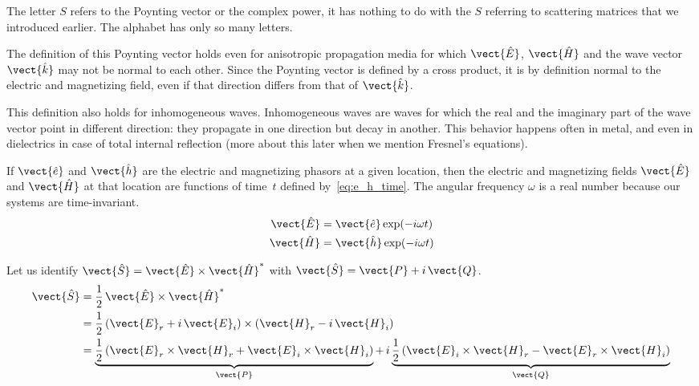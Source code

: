 The letter $S$ refers to the Poynting vector or the complex power, it has nothing to do with the $S$ referring to scattering matrices that we introduced earlier.
The alphabet has only so many letters.

The definition of this Poynting vector holds even for anisotropic propagation media for which $\vect{\hat{E}}$, $\vect{\hat{H}}$ and the wave vector $\vect{\hat{k}}$ may not be normal to each other.
Since the Poynting vector is defined by a cross product, it is by definition normal to the electric and magnetizing field, even if that direction differs from that of $\vect{\hat{k}}$.

This definition also holds for inhomogeneous waves.
Inhomogeneous waves are waves for which the real and the imaginary part of the wave vector point in different direction: they propagate in one direction but decay in another.
This behavior happens often in metal, and even in dielectrics in case of total internal reflection (more about this later when we mention Fresnel's equations).

If $\vect{\hat{e}}$ and $\vect{\hat{h}}$ are the electric and magnetizing phasors at a given location,
then the electric and magnetizing fields $\vect{\hat{E}}$ and $\vect{\hat{H}}$ at that location are functions of time~$t$ defined by~\cref{eq:e_h_time}.
The angular frequency $\omega$ is a real number because our systems are time-invariant.
\begin{subequations}
    \begin{align}
        \vect{\hat{E}} &= \vect{\hat{e}} \exp(-i \omega t) \\
        \vect{\hat{H}} &= \vect{\hat{h}} \exp(-i \omega t)
    \end{align}
    \label{eq:e_h_time}
\end{subequations}

Let us identify $\vect{\hat{S}} = \vect{\hat{E}} \times \vect{\hat{H}}^*$ with $\vect{\hat{S}} = \vect{P} + i\,\vect{Q}$.
\begin{subequations}
    \begin{align}
        \vect{\hat{S}}
        &= \frac{1}{2}\,\vect{\hat{E}} \times \vect{\hat{H}}^* \\
        &= \frac{1}{2}\,(\vect{E}_r + i\,\vect{E}_i) \times (\vect{H}_r - i\,\vect{H}_i) \\
        &= \underbrace{\frac{1}{2}\,(\vect{E}_r \times \vect{H}_r + \vect{E}_i \times \vect{H}_i)}_\vect{P} +\,
         i \underbrace{\frac{1}{2}\,(\vect{E}_i \times \vect{H}_r - \vect{E}_r \times \vect{H}_i)}_\vect{Q}
         \label{eq:SPQ_c}
    \end{align}
    \label{eq:SPQ}
\end{subequations}

